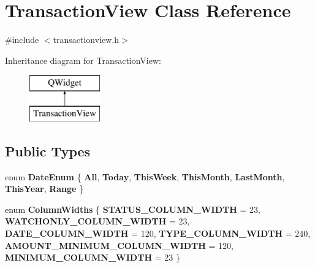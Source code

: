 \hypertarget{class_transaction_view}{}\section{Transaction\+View Class Reference}
\label{class_transaction_view}


{\ttfamily \#include $<$transactionview.\+h$>$}

Inheritance diagram for Transaction\+View\+:\begin{figure}[H]
\begin{center}
\leavevmode
\includegraphics[height=2.000000cm]{class_transaction_view}
\end{center}
\end{figure}
\subsection*{Public Types}
\begin{DoxyCompactItemize}
\item 
\mbox{\label{class_transaction_view_a73d1bbedc72fa131591aadb3aba150f8}} 
enum {\bfseries Date\+Enum} \{ \newline
{\bfseries All}, 
{\bfseries Today}, 
{\bfseries This\+Week}, 
{\bfseries This\+Month}, 
\newline
{\bfseries Last\+Month}, 
{\bfseries This\+Year}, 
{\bfseries Range}
 \}
\item 
\mbox{\label{class_transaction_view_a330f6333f7d24ceef963729fa35fe985}} 
enum {\bfseries Column\+Widths} \{ \newline
{\bfseries S\+T\+A\+T\+U\+S\+\_\+\+C\+O\+L\+U\+M\+N\+\_\+\+W\+I\+D\+TH} = 23, 
{\bfseries W\+A\+T\+C\+H\+O\+N\+L\+Y\+\_\+\+C\+O\+L\+U\+M\+N\+\_\+\+W\+I\+D\+TH} = 23, 
{\bfseries D\+A\+T\+E\+\_\+\+C\+O\+L\+U\+M\+N\+\_\+\+W\+I\+D\+TH} = 120, 
{\bfseries T\+Y\+P\+E\+\_\+\+C\+O\+L\+U\+M\+N\+\_\+\+W\+I\+D\+TH} = 240, 
\newline
{\bfseries A\+M\+O\+U\+N\+T\+\_\+\+M\+I\+N\+I\+M\+U\+M\+\_\+\+C\+O\+L\+U\+M\+N\+\_\+\+W\+I\+D\+TH} = 120, 
{\bfseries M\+I\+N\+I\+M\+U\+M\+\_\+\+C\+O\+L\+U\+M\+N\+\_\+\+W\+I\+D\+TH} = 23
 \}
\end{DoxyCompactItemize}
